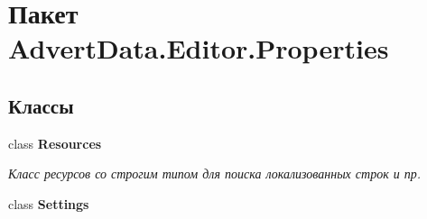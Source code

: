 \hypertarget{namespace_advert_data_1_1_editor_1_1_properties}{\section{Пакет Advert\+Data.\+Editor.\+Properties}
\label{namespace_advert_data_1_1_editor_1_1_properties}
}
\subsection*{Классы}
\begin{DoxyCompactItemize}
\item 
class {\bfseries Resources}
\begin{DoxyCompactList}\small\item\em Класс ресурсов со строгим типом для поиска локализованных строк и пр. \end{DoxyCompactList}\item 
class {\bfseries Settings}
\end{DoxyCompactItemize}
